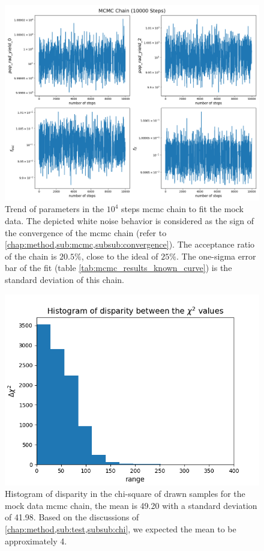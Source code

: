 \documentclass[12pt, TexShade, letterpaper]{report}
\begin{document}
\begin{figure}[h!]
\centering
\includegraphics[scale =0.5]{chain_known_curve.png}
\caption[Trend of parameters in the mock data \gls{mcmc} chain]{Trend of parameters in the $10^4$ steps \gls{mcmc} chain to fit the mock data. The depicted white noise behavior is considered as the sign of the convergence of the \gls{mcmc} chain (refer to \ref{chap:method,sub:mcmc,subsub:convergence}). The acceptance ratio of the chain is $20.5\%$, close to the ideal of $25\%$. The one-sigma error bar of the fit (table \ref{tab:mcmc_results_known_curve}) is the standard deviation of this chain.}
\label{fig:chain_known_curve}
\end{figure}

\begin{figure}[h!]
\centering
\includegraphics[scale =0.7]{csq_hist_known_curve.png}
\caption[Histogram of disparity in the chi-square of drawn samples for the mock data \gls{mcmc} chain]{Histogram of disparity in the chi-square of drawn samples for the mock data \gls{mcmc} chain, the mean is 49.20 with a standard deviation of 41.98. Based on the discussions of \ref{chap:method,sub:test,subsub:chi}, we expected the mean to be approximately 4.}
\label{fig:csq_hist_known_curve}
\end{figure}
\end{document}
